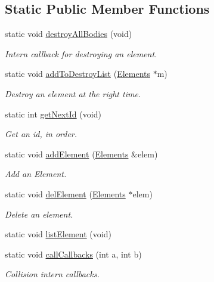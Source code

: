 \subsection*{Static Public Member Functions}
\begin{DoxyCompactItemize}
\item 
static void \hyperlink{class_game_ae391a35eb1f970669b0d6b236de4b885}{destroy\-All\-Bodies} (void)
\begin{DoxyCompactList}\small\item\em Intern callback for destroying an element. \end{DoxyCompactList}\item 
static void \hyperlink{class_game_ae3c5dc329506d37d244ef3587ac813af}{add\-To\-Destroy\-List} (\hyperlink{class_elements}{Elements} $\ast$m)
\begin{DoxyCompactList}\small\item\em Destroy an element at the right time. \end{DoxyCompactList}\item 
static int \hyperlink{class_game_aec4cafc10218eb665d67bf027ddbd3f1}{get\-Next\-Id} (void)
\begin{DoxyCompactList}\small\item\em Get an id, in order. \end{DoxyCompactList}\item 
static void \hyperlink{class_game_a10d84bf0157d5b3abf102846d5170af5}{add\-Element} (\hyperlink{class_elements}{Elements} \&elem)
\begin{DoxyCompactList}\small\item\em Add an Element. \end{DoxyCompactList}\item 
static void \hyperlink{class_game_a644e15f76310ed410817e8423ad7a5b2}{del\-Element} (\hyperlink{class_elements}{Elements} $\ast$elem)
\begin{DoxyCompactList}\small\item\em Delete an element. \end{DoxyCompactList}\item 
static void \hyperlink{class_game_aafc84f0b25d07825f08dffc07af73918}{list\-Element} (void)
\item 
static void \hyperlink{class_game_a34c8791251f785d270f757b6eff4ea56}{call\-Callbacks} (int a, int b)
\begin{DoxyCompactList}\small\item\em Collision intern callbacks. \end{DoxyCompactList}\item 

\end{DoxyCompactItemize}
